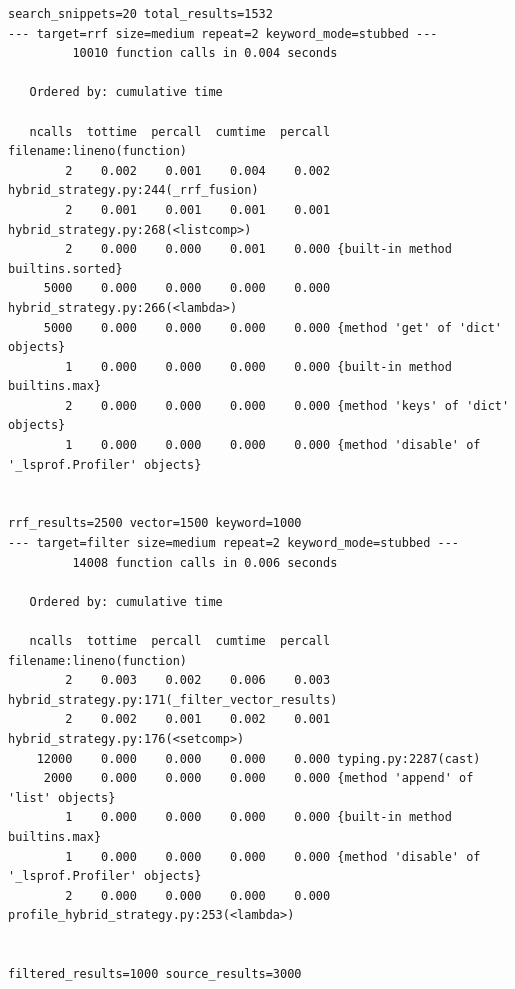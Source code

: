 \documentclass[a4paper,12pt]{article}
\begin{document}
\begin{lstlisting}[basicstyle=\ttfamily\fontsize{9}{9}\selectfont]
search_snippets=20 total_results=1532
--- target=rrf size=medium repeat=2 keyword_mode=stubbed ---
         10010 function calls in 0.004 seconds

   Ordered by: cumulative time

   ncalls  tottime  percall  cumtime  percall filename:lineno(function)
        2    0.002    0.001    0.004    0.002 hybrid_strategy.py:244(_rrf_fusion)
        2    0.001    0.001    0.001    0.001 hybrid_strategy.py:268(<listcomp>)
        2    0.000    0.000    0.001    0.000 {built-in method builtins.sorted}
     5000    0.000    0.000    0.000    0.000 hybrid_strategy.py:266(<lambda>)
     5000    0.000    0.000    0.000    0.000 {method 'get' of 'dict' objects}
        1    0.000    0.000    0.000    0.000 {built-in method builtins.max}
        2    0.000    0.000    0.000    0.000 {method 'keys' of 'dict' objects}
        1    0.000    0.000    0.000    0.000 {method 'disable' of '_lsprof.Profiler' objects}


rrf_results=2500 vector=1500 keyword=1000
--- target=filter size=medium repeat=2 keyword_mode=stubbed ---
         14008 function calls in 0.006 seconds

   Ordered by: cumulative time

   ncalls  tottime  percall  cumtime  percall filename:lineno(function)
        2    0.003    0.002    0.006    0.003 hybrid_strategy.py:171(_filter_vector_results)
        2    0.002    0.001    0.002    0.001 hybrid_strategy.py:176(<setcomp>)
    12000    0.000    0.000    0.000    0.000 typing.py:2287(cast)
     2000    0.000    0.000    0.000    0.000 {method 'append' of 'list' objects}
        1    0.000    0.000    0.000    0.000 {built-in method builtins.max}
        1    0.000    0.000    0.000    0.000 {method 'disable' of '_lsprof.Profiler' objects}
        2    0.000    0.000    0.000    0.000 profile_hybrid_strategy.py:253(<lambda>)


filtered_results=1000 source_results=3000
\end{lstlisting}
\end{document}
